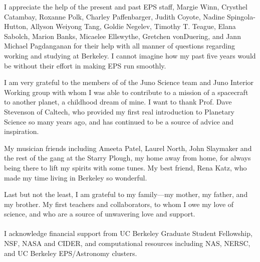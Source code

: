 \documentclass[phd,12pt]{ucbthesis}
\begin{document}
\begin{frontmatter}
\begin{acknowledgements}
I appreciate the help of the present and past EPS staff, Margie Winn, Crysthel
Catambay, Roxanne Polk, Charley Paffenbarger, Judith Coyote, Nadine Spingola-Hutton,
Allyson Weiyong Tang, Goldie Negelev, Timothy T. Teague, Elana Sabolch, Marion Banks,
Micaelee Ellswythe, Gretchen vonDuering, and Jann Michael Pagdanganan for their help
with all manner of questions regarding working and studying at Berkeley.  I cannot
imagine how my past five years would be without their effort in making EPS run
smoothly.

I am very grateful to the members of of the Juno Science team and Juno Interior
Working group with whom I was able to contribute to a mission of a spacecraft to
another planet, a childhood dream of mine.
I want to thank Prof. Dave Stevenson of Caltech, who provided my first real introduction
to Planetary Science so many years ago, and has continued to be a source of advice
and inspiration.

My musician friends including Ameeta Patel, Laurel North, John
Slaymaker and the rest of the gang at the Starry Plough, my home away from home, for
always being there to lift my spirits with some tunes.
My best friend, Rena Katz, who made my time living in Berkeley so wonderful.

Last but not the least, I am grateful to my family---my mother, my father, and my
brother. My first teachers and collaborators, to whom I owe my love of science, and
who are a source of unwavering love and support. \\\\

I acknowledge financial support from UC Berkeley Graduate Student Fellowship, NSF,
NASA and CIDER, and computational resources including NAS, NERSC, and UC Berkeley
EPS/Astronomy clusters.

\end{acknowledgements}

\end{frontmatter}

\pagestyle{headings}














%
%
%

%
%



\end{document}

